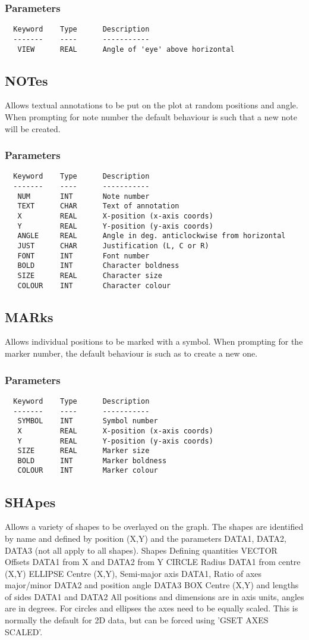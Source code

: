 \documentclass{book}
\renewcommand{\_}{{\tt\char'137}}     %
\begin{document}
\subsubsection{Parameters}
\begin{verbatim}
  Keyword    Type      Description
  -------    ----      -----------
   VIEW      REAL      Angle of 'eye' above horizontal
\end{verbatim}\subsection{NOTes}
Allows textual annotations to be put on the plot at random
positions and angle. When prompting for note number the
default behaviour is such that a new note will be created.
\subsubsection{Parameters}
\begin{verbatim}
  Keyword    Type      Description
  -------    ----      -----------
   NUM       INT       Note number
   TEXT      CHAR      Text of annotation
   X         REAL      X-position (x-axis coords)
   Y         REAL      Y-position (y-axis coords)
   ANGLE     REAL      Angle in deg. anticlockwise from horizontal
   JUST      CHAR      Justification (L, C or R)
   FONT      INT       Font number
   BOLD      INT       Character boldness
   SIZE      REAL      Character size
   COLOUR    INT       Character colour
\end{verbatim}\subsection{MARks}
Allows individual positions to be marked with a symbol. When
prompting for the marker number, the default behaviour is such as
to create a new one.
\subsubsection{Parameters}
\begin{verbatim}
  Keyword    Type      Description
  -------    ----      -----------
   SYMBOL    INT       Symbol number
   X         REAL      X-position (x-axis coords)
   Y         REAL      Y-position (y-axis coords)
   SIZE      REAL      Marker size
   BOLD      INT       Marker boldness
   COLOUR    INT       Marker colour
\end{verbatim}\subsection{SHApes}
Allows a variety of shapes to be overlayed on the graph. The
shapes are identified by name and defined by position (X,Y)
and the parameters DATA1, DATA2, DATA3 (not all apply to all
shapes).
Shapes Defining quantities
VECTOR Offsets DATA1 from X and DATA2 from Y
CIRCLE Radius DATA1 from centre (X,Y)
ELLIPSE Centre (X,Y), Semi-major axis DATA1,
Ratio of axes major/minor DATA2 and
position angle DATA3
BOX Centre (X,Y) and lengths of sides
DATA1 and DATA2
All positions and dimensions are in axis units, angles are
in degrees. For circles and ellipses the axes need to be
equally scaled. This is normally the default for 2D data,
but can be forced using 'GSET AXES SCALED'.
\end{document}
